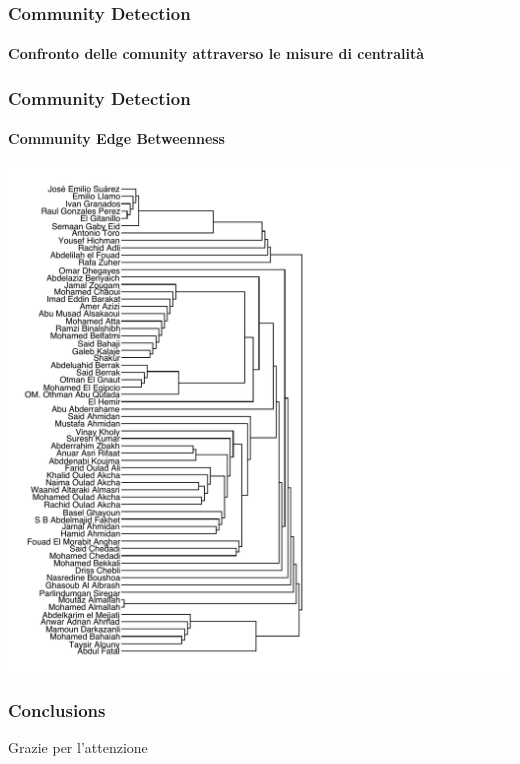 \documentclass[hyperref={pdfpagelabels=false}]{beamer}
\begin{document}

\begin{frame}
\frametitle{Community Detection}
\framesubtitle{Confronto delle comunity attraverso le misure di centralità}

\end{frame}


\begin{frame}
\frametitle{Community Detection}
\framesubtitle{Community Edge Betweenness}
 \centering
\includegraphics[scale=0.35]{images/community_edge_betweenness.pdf}
\end{frame}

\begin{frame}
\frametitle{Conclusions}


\end{frame}

\begin{frame}
\Huge{\centerline{Grazie per l'attenzione}}
\end{frame}
\end{document}
